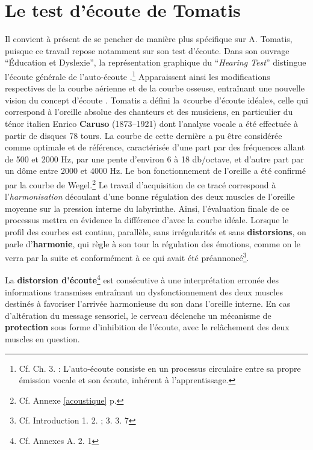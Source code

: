 
\section{Le test d'écoute de Tomatis}

Il convient à présent de se pencher de manière plus spécifique sur
A. Tomatis, puisque ce travail repose notamment sur son test d'écoute.
Dans son ouvrage ``Éducation et
    Dyslexie''\autocite{tomatis:education}, la représentation graphique du
 ``\emph{Hearing Test}'' distingue l'écoute générale de
 l'auto-écoute \autocite{tomatis_oreille_1991}.\footnote{Cf. Ch. 3. : L'auto-écoute consiste en un processus
   circulaire entre sa propre  émission vocale et son écoute, inhérent
   à l'apprentissage. }
 Apparaissent ainsi les modifications respectives
 de la courbe aérienne et de la courbe osseuse, entraînant une nouvelle vision
 du concept d'écoute \autocite{tomatis_conf}.%
 Tomatis a défini la «courbe d'écoute idéale», celle qui correspond à l'oreille absolue
des chanteurs et des musiciens, en particulier du ténor italien Enrico
\textbf{Caruso} (1873--1921) dont l'analyse vocale a été effectuée à partir de
disques 78 tours. La courbe de cette dernière a pu être considérée comme
optimale et de référence, caractérisée d'une part par des fréquences allant de 500 et 2000
Hz, par une pente d\textquoteright environ 6 à 18 db/octave,
et d'autre part par un dôme entre 2000 et 4000 Hz.
Le bon fonctionnement de l'oreille a été confirmé par la courbe
de Wegel.\footnote{Cf. Annexe \ref{acoustique} p. \pageref{acoustique}}
 Le travail d'acquisition de ce tracé correspond à l'\textsl{harmonisation}
découlant d'une bonne régulation des deux muscles de l'oreille moyenne
sur la pression interne du
labyrinthe.
Ainsi, l'évaluation finale de ce processus mettra en évidence la différence
d'avec la courbe idéale.
Lorsque le profil des
courbes est continu, parallèle, sans irrégularités et sans
\textbf{distorsions}, on parle d'\textbf{harmonie}, qui règle à son tour
la régulation des émotions, comme on le verra par la suite et conformément à
ce qui avait été préannoncé\footnote{Cf. Introduction 1. 2. ; 3. 3. 7}.



La \textbf{distorsion d'écoute}\footnote{Cf. Annexes A. 2. 1}
 est consécutive à une interprétation
erronée des informations transmises entraînant un dysfonctionnement
des deux muscles destinés à favoriser l'arrivée
harmonieuse du son dans l'oreille interne.
En cas d'altération du message sensoriel,
le cerveau déclenche un mécanisme de\textbf{ protection} sous forme
d'inhibition de l'écoute, avec le relâchement des deux muscles en
question.


